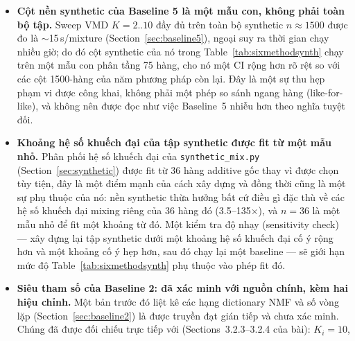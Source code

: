 \documentclass[11pt]{article}
\begin{document}
\begin{itemize}
{    huấn luyện đủ, không phải một mô hình đã tinh chỉnh.}
    Table~\ref{tab:b6diag} cho thấy mọi fold đều tiêu tốn hết ngân sách
    25-epoch mà tiêu chí dừng sớm không bao giờ kích hoạt, trên một pool
    $\sim$32 bản ghi huấn luyện mỗi lớp mỗi fold --- phù hợp với một kết
    quả bị giới hạn bởi ngân sách compute chứ không phải đã hội tụ
    (Section~\ref{sec:baseline6}). Kết quả của nó nên được đọc như xác
    thực hạ tầng, không phải kết quả neural tốt nhất có thể đạt được của
    dự án này; một ngân sách huấn luyện dài hơn và/hoặc augmentation tại
    chỗ mạnh tay hơn là các bước tiếp theo tự nhiên trước khi coi thứ
    hạng của Baseline~6 so với Baseline~1--5 là cuối cùng.
  \item \textbf{Cột nền synthetic của Baseline 5 là một mẫu con, không
    phải toàn bộ tập.} Sweep VMD $K{=}2..10$ đầy đủ trên toàn bộ
    synthetic $n{\approx}1500$ được đo là $\sim$15\,s/mixture
    (Section~\ref{sec:baseline5}), ngoại suy ra thời gian chạy nhiều giờ;
    do đó cột synthetic của nó trong Table~\ref{tab:sixmethodsynth} chạy
    trên một mẫu con phân tầng 75 hàng, cho nó một CI rộng hơn rõ rệt so
    với các cột 1500-hàng của năm phương pháp còn lại. Đây là một sự thu
    hẹp phạm vi được công khai, không phải một phép so sánh ngang hàng
    (like-for-like), và không nên được đọc như việc Baseline~5 nhiễu hơn
    theo nghĩa tuyệt đối.
  \item \textbf{Khoảng hệ số khuếch đại của tập synthetic được fit từ một
    mẫu nhỏ.} Phân phối hệ số khuếch đại của \texttt{synthetic\_mix.py}
    (Section~\ref{sec:synthetic}) được fit từ 36 hàng additive gốc thay
    vì được chọn tùy tiện, đây là một điểm mạnh của cách xây dựng và
    đồng thời cũng là một sự phụ thuộc của nó: nền synthetic thừa hưởng
    bất cứ điều gì đặc thù về các hệ số khuếch đại mixing riêng của 36
    hàng đó (3.5--135$\times$), và $n{=}36$ là một mẫu nhỏ để fit một
    khoảng từ đó. Một kiểm tra độ nhạy (sensitivity check) --- xây dựng
    lại tập synthetic dưới một khoảng hệ số khuếch đại cố ý rộng hơn và
    một khoảng cố ý hẹp hơn, sau đó chạy lại một baseline --- sẽ giới
    hạn mức độ Table~\ref{tab:sixmethodsynth} phụ thuộc vào phép fit đó.
  \item \textbf{Siêu tham số của Baseline 2: đã xác minh với nguồn
    chính, kèm hai hiệu chỉnh.} Một bản trước đó liệt kê các hạng
    dictionary NMF và số vòng lặp (Section~\ref{sec:baseline2}) là được
    truyền đạt gián tiếp và chưa xác minh. Chúng đã được đối chiếu trực
    tiếp với \cite{nmfcrnn} (Sections~3.2.3--3.2.4 của bài): $K_i{=}10$,

\end{itemize}
\end{document}
